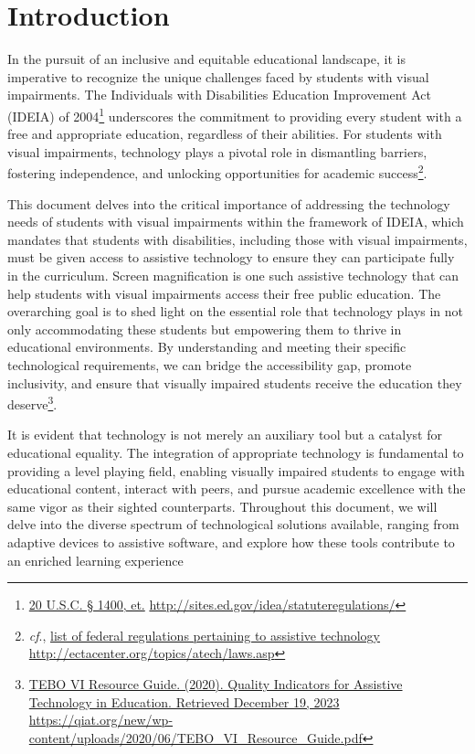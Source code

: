 \hypertarget{intro}{}\chapter*{Introduction}\label{intro}
\renewcommand{\cftchapleader}{\cftdotfill{\cftdotsep}}
\pagestyle{fancyplain}
\fancyfoot[C]{\thepage}
In the pursuit of an inclusive and equitable educational landscape, it is imperative to recognize the unique challenges faced by students with visual impairments. The Individuals with Disabilities Education Improvement Act (IDEIA) of 2004\footnote{\raggedright \href{http://sites.ed.gov/idea/statuteregulations/}{20 U.S.C. § 1400, et.} \url{http://sites.ed.gov/idea/statuteregulations/}} underscores the commitment to providing every student with a free and appropriate education, regardless of their abilities. For students with visual impairments, technology plays a pivotal role in dismantling barriers, fostering independence, and unlocking opportunities for academic success\footnote{\raggedright \textit{cf}., \href{http://ectacenter.org/topics/atech/laws.asp}{list of federal regulations pertaining to assistive technology} \hfill\break\url{http://ectacenter.org/topics/atech/laws.asp}}.

This document delves into the critical importance of addressing the technology needs of students with visual impairments within the framework of IDEIA, which mandates that students with disabilities, including those with visual impairments, must be given access to assistive technology to ensure they can participate fully in the curriculum. Screen magnification is one such assistive technology that can help students with visual impairments access their free public education\footnotemark[\value{footnote}]. The overarching goal is to shed light on the essential role that technology plays in not only accommodating these students but empowering them to thrive in educational environments. By understanding and meeting their specific technological requirements, we can bridge the accessibility gap, promote inclusivity, and ensure that visually impaired students receive the education they deserve\footnote{\raggedright \href{https://qiat.org/new/wp-content/uploads/2020/06/TEBO_VI_Resource_Guide.pdf}{TEBO VI Resource Guide. (2020). Quality Indicators for Assistive Technology in Education. Retrieved December 19, 2023} \url{https://qiat.org/new/wp-content/uploads/2020/06/TEBO_VI_Resource_Guide.pdf}}.

It is evident that technology is not merely an auxiliary tool but a catalyst for educational equality. The integration of appropriate technology is fundamental to providing a level playing field, enabling visually impaired students to engage with educational content, interact with peers, and pursue academic excellence with the same vigor as their sighted counterparts. Throughout this document, we will delve into the diverse spectrum of technological solutions available, ranging from adaptive devices to assistive software, and explore how these tools contribute to an enriched learning experience
